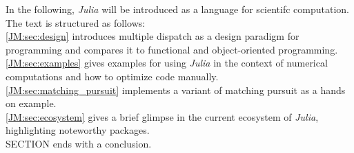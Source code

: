 In the following, \textit{Julia} will be introduced as a language for scientifc computation. The text is structured as follows: \\
\ref{JM:sec:design} introduces multiple dispatch as a design paradigm for programming and compares it to functional and object-oriented programming.\\
\ref{JM:sec:examples} gives examples for using \textit{Julia} in the context of numerical computations and how to optimize code manually.\\
\ref{JM:sec:matching_pursuit} implements a variant of matching pursuit as a hands on example.\\
\ref{JM:sec:ecosystem} gives a brief glimpse in the current ecosystem of \textit{Julia}, highlighting noteworthy packages.\\
SECTION ends with a conclusion.

\newpage


%
